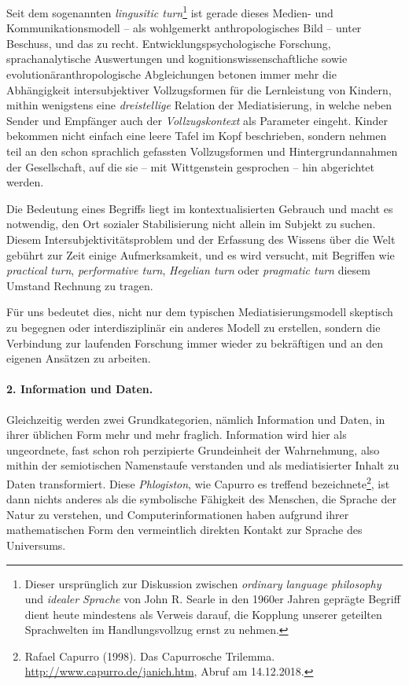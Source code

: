 \documentclass[a4paper,11pt]{article}
\begin{document}
Seit dem sogenannten \emph{lingusitic turn}\footnote{Dieser ursprünglich zur
  Diskussion zwischen \emph{ordinary language philosophy} und \emph{idealer
    Sprache} von John R. Searle in den 1960er Jahren geprägte Begriff dient
  heute mindestens als Verweis darauf, die Kopplung unserer geteilten
  Sprachwelten im Handlungsvollzug ernst zu nehmen. } ist gerade dieses
Medien- und Kommunikationsmodell -- als wohlgemerkt anthropologisches Bild --
unter Beschuss, und das zu recht.  Entwicklungspsychologische Forschung,
sprachanalytische Auswertungen und kognitionswissenschaftliche sowie
evolutionäranthropologische Abgleichungen betonen immer mehr die Abhängigkeit
intersubjektiver Vollzugsformen für die Lernleistung von Kindern, mithin
wenigstens eine \emph{dreistellige} Relation der Mediatisierung, in welche
neben Sender und Empfänger auch der \emph{Vollzugskontext} als Parameter
eingeht. Kinder bekommen nicht einfach eine leere Tafel im Kopf beschrieben,
sondern nehmen teil an den schon sprachlich gefassten Vollzugsformen und
Hintergrundannahmen der Gesellschaft, auf die sie -- mit Wittgenstein
gesprochen -- hin abgerichtet werden.

Die Bedeutung eines Begriffs liegt im kontextualisierten Gebrauch und macht es
notwendig, den Ort sozialer Stabilisierung nicht allein im Subjekt zu suchen.
Diesem Intersubjektivitätsproblem und der Erfassung des Wissens über die Welt
gebührt zur Zeit einige Aufmerksamkeit, und es wird versucht, mit Begriffen
wie \emph{practical turn}, \emph{performative turn}, \emph{Hegelian turn} oder
\emph{pragmatic turn} diesem Umstand Rechnung zu tragen.

Für uns bedeutet dies, nicht nur dem typischen Mediatisierungsmodell skeptisch
zu begegnen oder interdisziplinär ein anderes Modell zu erstellen, sondern die
Verbindung zur laufenden Forschung immer wieder zu bekräftigen und an den
eigenen Ansätzen zu arbeiten.

\paragraph{2. Information und Daten.}

Gleichzeitig werden zwei Grundkategorien, nämlich Information und Daten, in
ihrer üblichen Form mehr und mehr fraglich. Information wird hier als
ungeordnete, fast schon roh perzipierte Grundeinheit der Wahrnehmung, also
mithin der semiotischen Namenstaufe verstanden und als mediatisierter Inhalt
zu Daten transformiert. Diese \emph{Phlogiston}, wie Capurro es treffend
bezeichnete\footnote{Rafael Capurro (1998). Das Capurrosche Trilemma.
  \url{http://www.capurro.de/janich.htm}, Abruf am 14.12.2018.}, ist dann
nichts anderes als die symbolische Fähigkeit des Menschen, die Sprache der
Natur zu verstehen, und Computerinformationen haben aufgrund ihrer
mathematischen Form den vermeintlich direkten Kontakt zur Sprache des
Universums.
\end{document}
